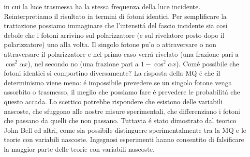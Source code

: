\documentclass[a4paper]{article}
\numberwithin{equation}{section}
\begin{document}
\begin{enumerate}
in cui la luce trasmessa ha la stessa frequenza della luce incidente. Reinterpretiamo il risultato in termini di fotoni identici. Per semplificare la trattazione possiamo immaginare che l'intensit\'a del fascio incidente sia cos\'i debole che i fotoni arrivino sul polarizzatore (e sul rivelatore posto dopo il polarizzatore) uno alla volta. Il singolo fotone pu'o o attraversare o non attraversare il polarizzatore e nel primo caso verr\'a rivelato (una frazione pari a $\cos^2 \alpha x$), nel secondo no (una frazione pari a $1 - \cos^2 \alpha x$). Com\'e possibile che fotoni identici si comportino diversamente? La risposta della MQ \'e che il determinismo viene meno: \'e impossibile prevedere se un singolo fotone venga assorbito o trasmesso, il meglio che possiamo fare \'e prevedere le probabilit\'a che questo accada. Lo scettico potrebbe rispondere che esistono delle variabili nascoste, che sfuggono alle nostre misure sperimentali, che differenziano i fotoni che passano da quelli che non passano. Tuttavia \'e stato dimostrato dal teorico John Bell ed altri, come sia possibile distinguere sperimentalmente tra la MQ e le teorie con variabili nascoste. Ingegnosi esperimenti hanno consentito di falsificare la maggior parte delle teorie con variabili nascoste.
\end{enumerate}

\newpage



\newpage
\end{document}
